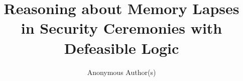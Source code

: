 \documentclass[runningheads,envcountsame]{llncs}
\begin{document}
\title{Reasoning about Memory Lapses in Security Ceremonies with Defeasible Logic}
\author{Anonymous Author(s)}

\maketitle
















\appendix



\end{document}
